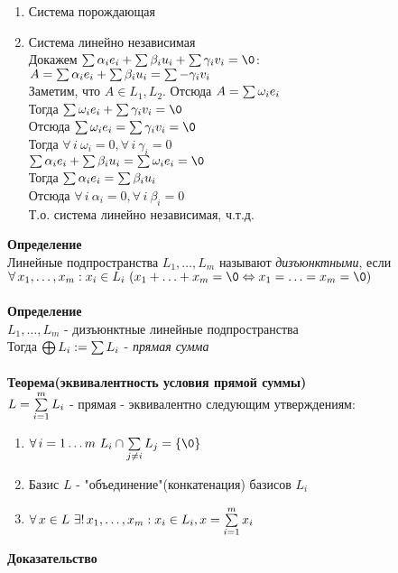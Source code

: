 \documentclass[12pt]{article}
\begin{document}
\begin{enumerate}
    \item Система порождающая
    \item Система линейно независимая\\
    Докажем $\suml \alpha_i e_i + \suml \beta_i u_i + \suml \gamma_i v_i = \0$:\\
    $A = \sum\limits \alpha_i e_i + \sum\limits \beta_i u_i = \sum\limits -\gamma_i v_i$\\
    Заметим, что $A \in L_1, L_2$. Отсюда $A = \sum\limits \omega_i e_i$\\
    Тогда $\suml \omega_i e_i + \sum \gamma_i v_i = \0$\\
    Отсюда $\suml \omega_i e_i = \sum \gamma_i v_i = \0$\\
    Тогда $\forall\,i\ \omega_i = 0, \forall\,i\ \gamma_i = 0$\\
    $\suml \alpha_i e_i + \suml \beta_i u_i = \suml \omega_i e_i = \0$\\
    Тогда $\sum\limits \alpha_i e_i = \sum\limits \beta_i u_i$\\
    Отсюда $\forall\,i\ \alpha_i = 0, \forall\,i\ \beta_i = 0$\\
    Т.о. система линейно независимая, ч.т.д.\\
\end{enumerate}
\textbf{Определение}\\
Линейные подпространства $L_1,\ldots,L_m$ называют \textit{дизъюнктными}, если $\forall\,x_1,\ldots,x_m: x_i\in L_i\ (x_1+\ldots+x_m = \0 \Leftrightarrow x_1=\ldots=x_m=\0)$\\\\
\textbf{Определение}\\
$L_1,\ldots,L_m$ - дизъюнктные линейные подпространства\\
Тогда $\bigoplus\limits L_i := \sum\limits L_i$ - \textit{прямая сумма}\\\\
\textbf{Теорема(эквивалентность условия прямой суммы)}\\
$L=\sum\limits_{i=1}^m L_i$ - прямая - эквивалентно следующим утверждениям:
\begin{enumerate}
    \item $\forall\,i=1\ldots m\ L_i \cap \suml_{j\neq i} L_j = \{\0\}$
    \item Базис $L$ - "объединение"(конкатенация) базисов $L_i$
    \item $\forall\,x\in L\ \exists!\, x_1,\ldots,x_m: x_i \in L_i, x = \sum\limits_{i=1}^m x_i$
\end{enumerate}
\textbf{Доказательство}\\
\end{document}
